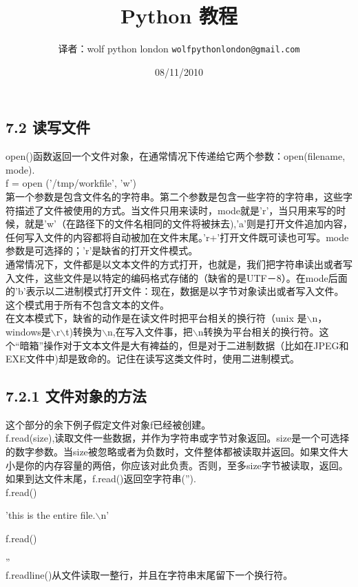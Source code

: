 \documentclass{book}
\begin{document}
\begin{CJK}{UTF8}{nsung}
\title{Python 教程}
\author{译者：wolf python london \texttt{wolfpythonlondon@gmail.com}}
\date{08/11/2010}
\maketitle


\section*{7.2  读写文件}

open()函数返回一个文件对象，在通常情况下传递给它两个参数：open(filename, mode). \\

f ={\color{red} open}{\color{blue} ('/tmp/workfile', 'w')}\\

第一个参数是包含文件名的字符串。第二个参数是包含一些字符的字符串，这些字符描述了文件被使用的方式。当文件只用来读时，mode就是'r'，当只用来写的时候，就是'w'（在路径下的文件名相同的文件将被抹去),'a'则是打开文件追加内容，任何写入文件的内容都将自动被加在文件末尾。'r+'打开文件既可读也可写。mode参数是可选择的；'r'是缺省的打开文件模式。\\

通常情况下，文件都是以文本文件的方式打开，也就是，我们把字符串读出或者写入文件，这些文件是以特定的编码格式存储的（缺省的是UTF－8）。在mode后面的'b'表示以二进制模式打开文件：现在，数据是以字节对象读出或者写入文件。这个模式用于所有不包含文本的文件。\\

在文本模式下，缺省的动作是在读文件时把平台相关的换行符（unix 是$\backslash$n，windows是$\backslash$r$\backslash$t)转换为$\backslash$n,在写入文件事，把$\backslash$n转换为平台相关的换行符。这个“暗箱”操作对于文本文件是大有裨益的，但是对于二进制数据（比如在JPEG和EXE文件中)却是致命的。记住在读写这类文件时，使用二进制模式。\\


\subsection*{7.2.1  文件对象的方法}

这个部分的余下例子假定文件对象f已经被创建。\\

f.read(size),读取文件一些数据，并作为字符串或字节对象返回。size是一个可选择的数字参数。当size被忽略或者为负数时，文件整体都被读取并返回。如果文件大小是你的内存容量的两倍，你应该对此负责。否则，至多size字节被读取，返回。如果到达文件末尾，f.read()返回空字符串('').\\

f.{\color{red}read()}

'this is the entire file.$\backslash$n'

f.{\color{red}read()}

''\\
	
f.readline()从文件读取一整行，并且在字符串末尾留下一个换行符。



\end{CJK}
\end{document}
